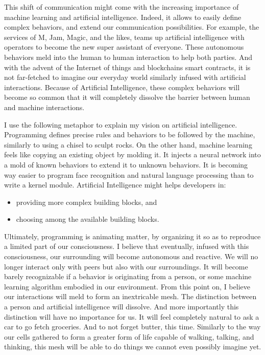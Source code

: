 This shift of communication might come with the increasing importance of machine learning and artificial intelligence.
Indeed, it allows to easily define complex behaviors, and extend our communication possibilities.
For example, the services of M, Jam, Magic, and the likes, teams up artificial intelligence with operators to become the new super assistant of everyone.
These autonomous behaviors meld into the human to human interaction to help both parties.
And with the advent of the Internet of things and blockchains smart contracts, it is not far-fetched to imagine our everyday world similarly infused with artificial interactions.
Because of Artificial Intelligence, these complex behaviors will become so common that it will completely dissolve the barrier between human and machine interactions. 

I use the following metaphor to explain my vision on artificial intelligence.
Programming defines precise rules and behaviors to be followed by the machine, similarly to using a chisel to sculpt rocks.
On the other hand, machine learning feels like copying an existing object by molding it.
It injects a neural network into a mold of known behaviors to extend it to unknown behaviors.
It is becoming way easier to program face recognition and natural language processing than to write a kernel module.
Artificial Intelligence might helps developers in:

\begin{itemize}
  \item providing more complex building blocks, and
  \item choosing among the available building blocks.
\end{itemize}

Ultimately, programming is animating matter, by organizing it so as to reproduce a limited part of our consciousness.
I believe that eventually, infused with this consciousness, our surrounding will become autonomous and reactive.
We will no longer interact only with peers but also with our surroundings.
It will become barely recognizable if a behavior is originating from a person, or some machine learning algorithm embodied in our environment.
From this point on, I believe our interactions will meld to form an inextricable mesh.
The distinction between a person and artificial intelligence will dissolve.
And more importantly this distinction will have no importance for us.
It will feel completely natural to ask a car to go fetch groceries.
And to not forget butter, this time.
Similarly to the way our cells gathered to form a greater form of life capable of walking, talking, and thinking, this mesh will be able to do things we cannot even possibly imagine yet.


